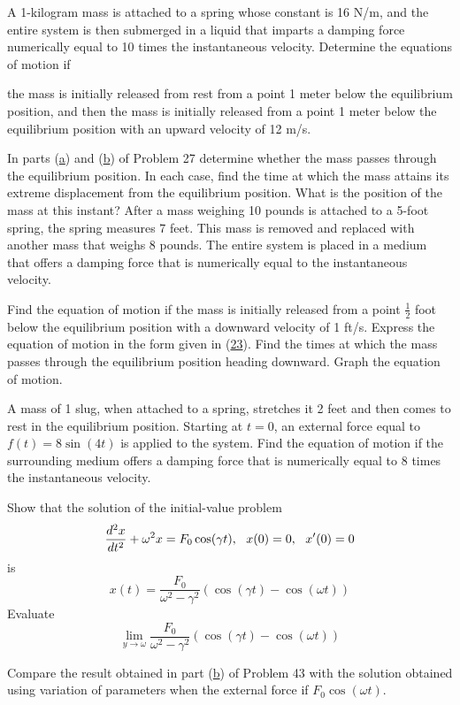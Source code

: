 \documentclass[12pt]{report}
\begin{document}
\begin{enumerate}[label=\arabic*.,start=3]
\begin{enumerate}[label=(\alph*)]
	\end{enumerate}
	\setcounter{enumi}{26}
	\problem A 1-kilogram mass is attached to a spring whose constant is 16 N/m, and the entire system is then submerged in a liquid that imparts a damping force numerically equal to 10 times the instantaneous velocity. Determine the equations of motion if
	\begin{enumerate}[label=(\alph*)]
	    \subproblem the mass is initially released from rest from a point 1 meter below the equilibrium position, and then
		\subproblem the mass is initially released from a point 1 meter below the equilibrium position with an upward velocity of 12 m/s.
	\end{enumerate}
	\problem In parts (\hyperref[prb:27a]{a}) and (\hyperref[prb:27b]{b}) of Problem 27 determine whether the mass passes through the equilibrium position. In each case, find the time at which the mass attains its extreme displacement from the equilibrium position. What is the position of the mass at this instant?
	\setcounter{enumi}{29}
	\problem After a mass weighing 10 pounds is attached to a 5-foot spring, the spring measures 7 feet. This mass is removed and replaced with another mass that weighs 8 pounds. The entire system is placed in a medium that offers a damping force that is numerically equal to the instantaneous velocity.
	\begin{enumerate}[label=(\alph*)]
	    \subproblem Find the equation of motion if the mass is initially released from a point $\frac{1}{2}$ foot below the equilibrium position with a downward velocity of 1 ft/s.
		\subproblem Express the equation of motion in the form given in (\hyperref[eq:23]{23}).
		\subproblem Find the times at which the mass passes through the equilibrium position heading downward.
		\subproblem Graph the equation of motion.
	\end{enumerate}
	\setcounter{enumi}{34}
	\problem A mass of 1 slug, when attached to a spring, stretches it 2 feet and then comes to rest in the equilibrium position. Starting at $t=0$, an external force equal to $f(t)=8\sin(4t)$ is applied to the system. Find the equation of motion if the surrounding medium offers a damping force that is numerically equal to 8 times the instantaneous velocity.
	\setcounter{enumi}{42}
	\problem 
	\begin{enumerate}[label=(\alph*)]
	    \subproblem Show that the solution of the initial-value problem \[ \frac{d^{2}x}{dt^{2}} + \omega^{2}x = F_{0}\cos(\gamma t),\mbox{{ }{ }} x(0)=0,\mbox{{ }{ }} x'(0)=0 \] is \[ x(t) = \frac{F_{0}}{\omega^{2} - \gamma^{2}}(\cos(\gamma t) - \cos(\omega t)) \]
		\subproblem Evaluate \[ \lim_{y\rightarrow \omega} \frac{F_{0}}{\omega^{2} - \gamma^{2}}(\cos(\gamma t) - \cos(\omega t)) \]
	\end{enumerate}
	\problem Compare the result obtained in part (\hyperref[prb:43b]{b}) of Problem 43 with the solution obtained using variation of parameters when the external force if $F_{0}\cos(\omega t)$.
\end{enumerate}
\end{document}
